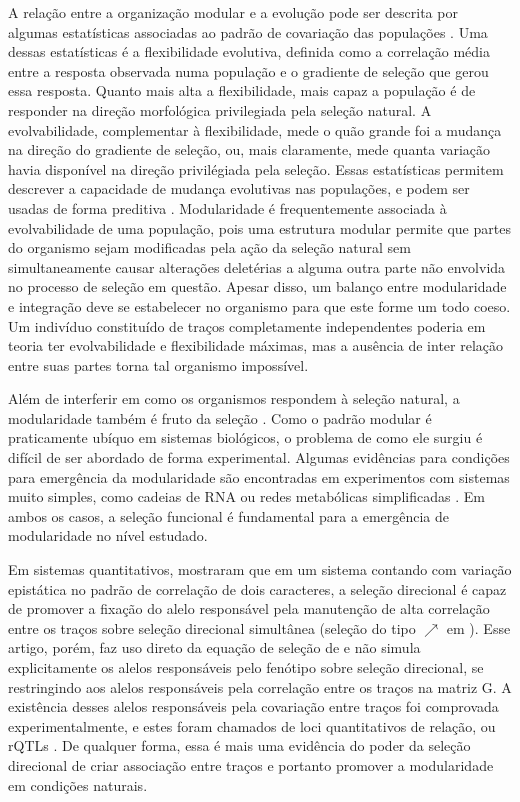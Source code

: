A relação entre a organização modular e a evolução pode ser descrita por
algumas estatísticas associadas ao padrão de covariação das populações
\citep{Hansen2008}. 
Uma dessas estatísticas é a flexibilidade evolutiva, definida como a
correlação média entre a resposta observada numa população e o gradiente
de seleção que gerou essa resposta. 
Quanto mais alta a flexibilidade, mais capaz a população é de responder
na direção morfológica privilegiada pela seleção natural. 
A evolvabilidade, complementar à flexibilidade, mede o quão grande foi a
mudança na direção do gradiente de seleção, ou, mais claramente, mede
quanta variação havia disponível na direção privilégiada pela seleção. 
Essas estatísticas permitem descrever a capacidade de mudança evolutivas
nas populações, e podem ser usadas de forma preditiva
\citep[veja, por exemplo,][]{Marroig2010}. 
Modularidade é frequentemente associada à evolvabilidade de uma
população, pois uma estrutura modular permite que partes do organismo sejam
modificadas pela ação da seleção natural sem simultaneamente causar
alterações deletérias a alguma outra parte não envolvida no processo de
seleção em questão. 
Apesar disso, um balanço entre modularidade e integração deve se
estabelecer no organismo para que este forme um todo coeso. 
Um indivíduo constituído de traços completamente independentes poderia
em teoria ter evolvabilidade e flexibilidade máximas, mas a ausência de
inter relação entre suas partes torna tal organismo impossível. 

Além de interferir em como os organismos respondem à seleção natural, a
modularidade também é fruto da seleção \citep{Wagner1996, Wagner2007}. 
Como o padrão modular é praticamente ubíquo em sistemas biológicos, o
problema de como ele surgiu é difícil de ser abordado de forma
experimental. 
Algumas evidências para condições para emergência da modularidade são
encontradas em experimentos com sistemas muito simples, como cadeias de
RNA \citep{Ancel2000} ou redes metabólicas simplificadas
\citep{Espinosa-Soto2010}. 
Em ambos os casos, a seleção funcional é fundamental para a emergência
de modularidade no nível estudado.

Em sistemas quantitativos, \cite{Pavlicev2010} mostraram que em um
sistema contando com variação epistática no padrão de correlação de dois
caracteres, a seleção direcional é capaz de promover a fixação do alelo
responsável pela manutenção de alta correlação entre os traços sobre
seleção direcional simultânea  (seleção do tipo $\nearrow$ em
\cite{Jones2004}). 
Esse artigo, porém, faz uso direto da equação de seleção de
\cite{Lande1979} e não simula explicitamente os alelos responsáveis pelo
fenótipo sobre seleção direcional, se restringindo aos alelos
responsáveis pela correlação entre os traços na matriz G. 
A existência desses alelos responsáveis pela covariação entre traços foi
comprovada experimentalmente, e estes foram chamados de loci
quantitativos de relação, ou rQTLs \citep{Pavlicev2008a}. 
De qualquer forma, essa é mais uma evidência do poder da seleção
direcional de criar associação entre traços e portanto promover a
modularidade em condições naturais. 

